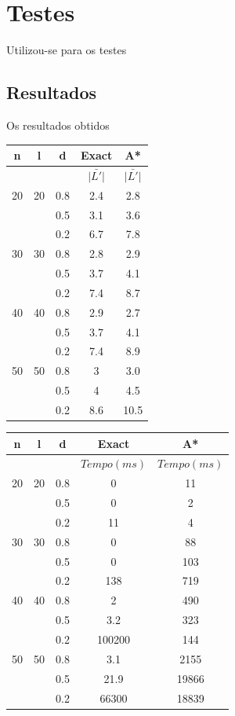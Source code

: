 \documentclass[12pt]{article}
\begin{document}
\section{Testes}\label{sec:testes}
	
	Utilizou-se para os testes 

	\subsection{Resultados}\label{sec:resultados}
		
		Os resultados obtidos 

		\begin{tabular}{c|c|c|c|c} \hline
			n & l & d & Exact & A* \\ \hline
			& & & $\bar{|L'|}$ & $\bar{|L'|}$ \\ \hline
			20 & 20 & 0.8 & 2.4 & 2.8\\
			 &  & 0.5 & 3.1 & 3.6\\
			 &  & 0.2 & 6.7 & 7.8\\ \hline
			30 & 30 & 0.8 & 2.8 & 2.9 \\
			 &  & 0.5 & 3.7 & 4.1\\
			 &  & 0.2 & 7.4 & 8.7\\ \hline
			40 & 40 & 0.8 & 2.9 & 2.7\\
			 &  & 0.5 & 3.7 & 4.1\\
			 &  & 0.2 & 7.4 & 8.9\\ \hline
			50 & 50 & 0.8 & 3 & 3.0\\
			 &  & 0.5 & 4 & 4.5\\
			 &  & 0.2 & 8.6 & 10.5\\ \hline
		\end{tabular}

		\vspace{2cm}

		\begin{tabular}{c|c|c|c|c} \hline
			n & l & d & Exact & A* \\ \hline
			& & & $Tempo(ms)$ & $Tempo(ms)$\\ \hline
			20 & 20 & 0.8 &  0 & 11\\
			   &    & 0.5 &  0 & 2\\
			   &    & 0.2 & 11 & 4\\ \hline
			30 & 30 & 0.8 &  0 & 88 \\
			   &    & 0.5 &  0 & 103\\
			   &    & 0.2 & 138 & 719\\ \hline
			40 & 40 & 0.8 &  2 & 490\\
			   &    & 0.5 & 3.2 & 323\\
			   &    & 0.2 & 100200 & 144\\ \hline
			50 & 50 & 0.8 & 3.1 & 2155\\
			   &    & 0.5 & 21.9 & 19866\\
			   &    & 0.2 & 66300 & 18839\\ \hline
		\end{tabular}
		
\end{document}
